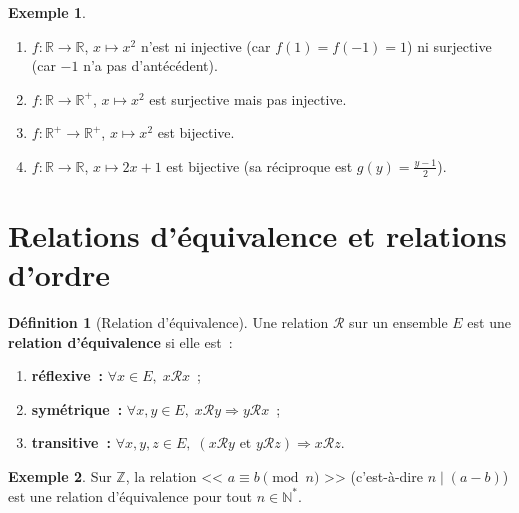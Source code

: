 \documentclass[12pt,a4paper,openany]{book}
\theoremstyle{definition}
\newtheorem{definition}{Définition}[chapter]
\newtheorem{exemple}{Exemple}[chapter]
\newcommand{\N}{\mathbb{N}}
\newcommand{\Z}{\mathbb{Z}}
\newcommand{\R}{\mathbb{R}}
\begin{document}
\begin{exemple}\label{ex:exemples-inj-surj}
  \begin{enumerate}[label=(\alph*)]
    \item $f : \R \to \R$, $x \mapsto x^2$ n'est ni injective (car $f(1) = f(-1) = 1$) ni surjective (car $-1$ n'a pas d'antécédent).
    \item $f : \R \to \R^+$, $x \mapsto x^2$ est surjective mais pas injective.
    \item $f : \R^+ \to \R^+$, $x \mapsto x^2$ est bijective.
    \item $f : \R \to \R$, $x \mapsto 2x + 1$ est bijective (sa réciproque est $g(y) = \frac{y-1}{2}$).
  \end{enumerate}
\end{exemple}


\section{Relations d'équivalence et relations d'ordre}
\label{sec:relations}

\begin{definition}[Relation d'équivalence]\label{def:rel-equiv}
  Une relation $\mathcal{R}$ sur un ensemble $E$ est une \textbf{relation d'équivalence} si elle est~:
  \begin{enumerate}[label=(\roman*)]
    \item \textbf{réflexive~:} $\forall x \in E,\; x \mathrel{\mathcal{R}} x$~;
    \item \textbf{symétrique~:} $\forall x, y \in E,\; x \mathrel{\mathcal{R}} y \Rightarrow y \mathrel{\mathcal{R}} x$~;
    \item \textbf{transitive~:} $\forall x, y, z \in E,\; (x \mathrel{\mathcal{R}} y \text{ et } y \mathrel{\mathcal{R}} z) \Rightarrow x \mathrel{\mathcal{R}} z$.
  \end{enumerate}
\end{definition}

\begin{exemple}\label{ex:equiv-mod}
  Sur $\Z$, la relation << $a \equiv b \pmod{n}$ >> (c'est-à-dire $n \mid (a-b)$) est une relation d'équivalence pour tout $n \in \N^*$.
\end{exemple}
\end{document}

